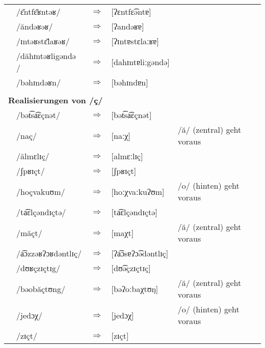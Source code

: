 \begin{longtable}[l]{p{0.1mm}lcll}
    & /ɛ̆ntfɛ̆ʁntəʁ/       & $\Rightarrow$ & [ʔɛntfɛ͡əntɐ]        &                                   \\
    & /ăndəʁəʁ/          & $\Rightarrow$ & [ʔandəʁɐ]           &                                   \\
    & /ɪntəʁstɛ̆laʁəʁ/    & $\Rightarrow$ & [ʔɪntɐstɛlaːʁɐ]     &                                   \\
    & /dăhɪntəʁligəndə / & $\Rightarrow$ & [dahɪntɐliːgəndə]   &                                   \\
    & /bəhɪndəʁn/        & $\Rightarrow$ & [bəhɪndɐn]          &                                   \\
  \multicolumn{5}{l}{ }                                                                            \\
  \multicolumn{5}{l}{\textbf{Realisierungen von /ç/}}                                              \\
    & /bət͡sa͡ɛçnət/       & $\Rightarrow$ & [bət͡sa͡ɛçnət]        &                                   \\
    & /naç/              & $\Rightarrow$ & [naːχ]              & /ă/ (zentral) geht voraus         \\
    & /ălmɛlɪç/          & $\Rightarrow$ & [almɛːlɪç]          &                                   \\
    & /ʃpʁɪçt/           & $\Rightarrow$ & [ʃpʁɪçt]            &                                   \\
    & /hoçvakuʊm/        & $\Rightarrow$ & [hoːχvaːkuʔʊm]      & /o/ (hinten) geht voraus          \\
    & /ta͡ɛlçəndɪçtə/     & $\Rightarrow$ & [ta͡ɛlçəndɪçtə]      &                                   \\
    & /măçt/             & $\Rightarrow$ & [maχt]              & /ă/ (zentral) geht voraus         \\
    & /a͡ɔzzəʁʔɔʁdəntlɪç/ & $\Rightarrow$ & [ʔa͡ɔsɐʔɔ͡ədəntlɪç]   &                                   \\
    & /dʊʁçzɪçtɪg/       & $\Rightarrow$ & [dʊ͡əçzɪçtɪç]        &                                   \\
    & /bəobăçtʊng/       & $\Rightarrow$ & [bəʔoːbaχtʊŋ]       & /ă/ (zentral) geht voraus         \\
    & /jedɔχ/            & $\Rightarrow$ & [jedɔχ]             & /o/ (hinten) geht voraus          \\
    & /zɪçt/             & $\Rightarrow$ & [zɪçt]              &                                   \\

\end{longtable}
